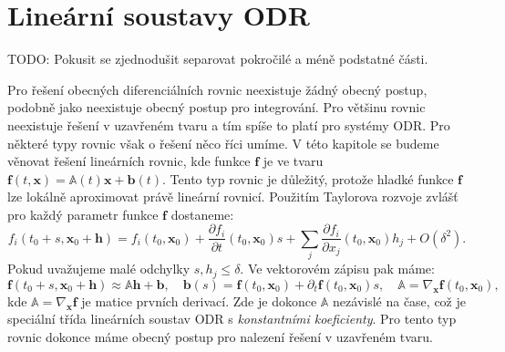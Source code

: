 \documentclass[a4paper, 12pt]{book}
\theoremstyle{definition}
\def\grad{\nabla}
\def\vc#1{\mathbf{\boldsymbol{#1}}}     %
\def\tn#1{{\mathbb{#1}}}    %
\def\prtl{\partial}                                        %
\def\df#1{\emph{#1}}
\def\todo#1{{\color{green}TODO:} #1}
\begin{document}
\section{Lineární soustavy ODR}
\todo{Pokusit se zjednodušit separovat pokročilé a méně podstatné části.}
\label{linearni_soustavy}


Pro řešení obecných diferenciálních rovnic neexistuje žádný obecný postup, podobně jako neexistuje obecný postup pro integrování. Pro většinu rovnic neexistuje
řešení v uzavřeném tvaru a tím spíše to platí pro systémy ODR. Pro některé typy rovnic však o řešení něco říci umíme. V této kapitole se budeme věnovat řešení lineárních rovnic, kde
funkce $\vc f$ je ve tvaru $\vc f(t,\vc x) = \tn A(t) \vc x + \vc b(t)$. Tento typ rovnic je důležitý, protože hladké funkce $\vc f$ lze lokálně aproximovat právě lineární rovnicí.
Použitím Taylorova rozvoje zvlášť pro každý parametr funkce $\vc f$ dostaneme:
\[
   f_i(t_0 + s, \vc x_0 + \vc h) = f_i(t_0, \vc x_0) + \frac{\prtl f_i}{\prtl t}(t_0,\vc x_0)s + \sum_j \frac{\prtl f_i}{\prtl x_j}(t_0,\vc x_0) h_j + O(\delta^2).
\]
Pokud uvažujeme malé odchylky $s, h_j \le \delta$. Ve vektorovém zápisu pak máme:
\[
  \vc f(t_0 + s, \vc x_0 + \vc h) \approx \tn A \vc h + \vc b,\quad \vc b(s)=\vc f(t_0, \vc x_0) + \prtl_{t} \vc f(t_0, \vc x_0) s,\quad \tn A = \grad_{\vc x} \vc f(t_0, \vc x_0),
\]
kde $\tn A =\grad_{\vc x} \vc f$ je matice prvních derivací. Zde je dokonce $\tn A$ nezávislé na čase, což je speciální třída lineárních soustav ODR s \df{konstantními koeficienty}.
Pro tento typ rovnic dokonce máme obecný postup pro nalezení řešení v uzavřeném tvaru.
\end{document}
